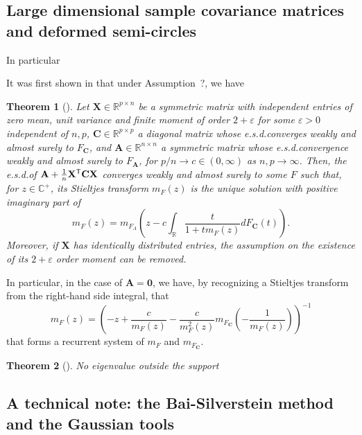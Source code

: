 \documentclass[MAL,biber]{nowfnt} %
\newcommand{\RED}{\color[rgb]{0.70,0,0}}
\newtheorem{Theorem}{Theorem}
\newcommand{\T}{{\sf T}}
\newcommand{\A}{{\mathbf{A}}}
\newcommand{\C}{{\mathbf{C}}}
\newcommand{\X}{{\mathbf{X}}}
\newcommand{\zo}{{\mathbf{0}}}
\newcommand{\RR}{{\mathbb{R}}}
\newcommand{\CC}{{\mathbb{C}}}
\begin{document}
{\RED 
\subsection{Large dimensional sample covariance matrices and deformed semi-circles}
}

In particular \citep{benaych2016spectral}

It was first shown in \citep{silverstein1995empirical} that under Assumption~?, we have 

\begin{Theorem}[\cite{silverstein1995empirical}]
Let $\X \in \RR^{p \times n}$ be a symmetric matrix with independent entries of zero mean, unit variance and finite moment of order $2+\varepsilon$ for some $\varepsilon > 0$ independent of $n,p$, $\C \in \RR^{p \times p}$ a diagonal matrix whose e.s.d.\@ converges weakly and almost surely to $F_\C$, and $\A \in \RR^{n \times n}$ a symmetric matrix whose e.s.d.\@ convergence weakly and almost surely to $F_\A$, for $p/n \to c \in (0,\infty)$ as $n,p \to \infty$. Then, the e.s.d.\@ of $\A + \frac1n \X^\T \C \X$ converges weakly and almost surely to some $F$ such that, for $z\in\CC^+$, its Stieltjes transform $m_F(z)$ is the unique solution with positive imaginary part of 
\[
	m_F(z) = m_{F_A}\left( z - c \int_\RR \frac{t}{1+ t m_F(z)} d F_{\C}(t) \right).
\]
Moreover, if $\X$ has identically distributed entries, the assumption on the existence of its $2+\varepsilon$ order moment can be removed.
\end{Theorem}
In particular, in the case of $\A = \zo$, we have, by recognizing a Stieltjes transform from the right-hand side integral, that
\[
	m_F(z) = \left( -z + \frac{c}{m_F(z)} - \frac{c}{m_F^2(z)} m_{F_\C} \left( - \frac1{m_F(z)} \right) \right)^{-1}
\]
that forms a recurrent system of $m_F$ and $m_{F_\C}$.

\begin{Theorem}[\cite{bai1998no}]\label{theo:no-eigenvalue-outside-support}
No eigenvalue outside the support
\end{Theorem}

{\RED 
\subsection{A technical note: the Bai-Silverstein method and the Gaussian tools}
}

\end{document}
